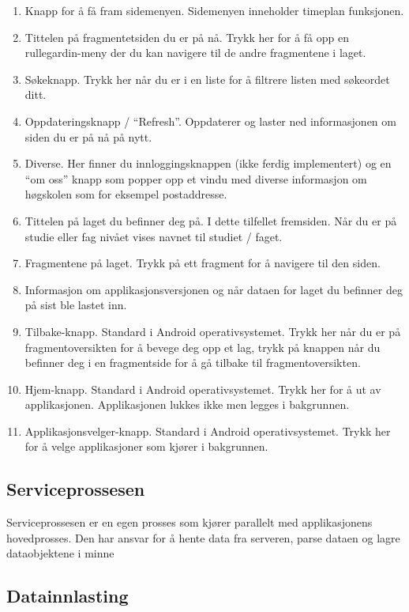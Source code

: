 \documentclass[../main.tex]{subfiles}
\begin{document}
\begin{enumerate}
\item Knapp for å få fram sidemenyen. Sidemenyen inneholder timeplan funksjonen.
\item Tittelen på fragmentetsiden du er på nå. Trykk her for å få opp en rullegardin-meny der du kan navigere til de andre fragmentene i laget.
\item Søkeknapp. Trykk her når du er i en liste for å filtrere listen med søkeordet ditt.
\item Oppdateringsknapp / “Refresh”. Oppdaterer og laster ned informasjonen om siden du er på nå på nytt.
\item Diverse. Her finner du innloggingsknappen (ikke ferdig implementert) og en “om oss” knapp som popper opp et vindu med diverse informasjon om høgskolen som for eksempel postaddresse.
\item Tittelen på laget du befinner deg på. I dette tilfellet fremsiden. Når du er på studie eller fag nivået vises navnet til studiet / faget.
\item Fragmentene på laget. Trykk på ett fragment for å navigere til den siden.
\item Informasjon om applikasjonsversjonen og når dataen for laget du befinner deg på sist ble lastet inn.
\item Tilbake-knapp. Standard i Android operativsystemet. Trykk her når du er på fragmentoversikten for å bevege deg opp et lag, trykk på knappen når du befinner deg i en fragmentside for å gå tilbake til fragmentoversikten.
\item Hjem-knapp. Standard i Android operativsystemet. Trykk her for å ut av applikasjonen. Applikasjonen lukkes ikke men legges i bakgrunnen.
\item Applikasjonsvelger-knapp. Standard i Android operativsystemet. Trykk her for å velge applikasjoner som kjører i bakgrunnen.
\end{enumerate}

\subsection{Serviceprossesen}

Serviceprossesen er en egen prosses som kjører parallelt med applikasjonens hovedprosses. Den har ansvar for å hente data fra serveren, parse dataen og lagre dataobjektene i minne

\subsection{Datainnlasting}
\end{document}
